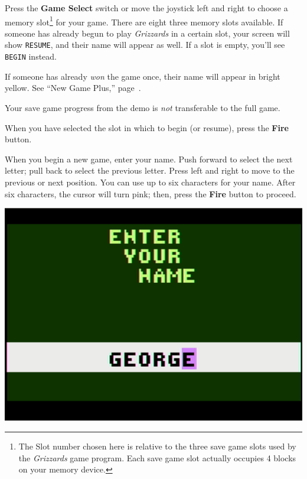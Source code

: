 \documentclass[10pt,twocolumn,openany,article]{memoir}
\begin{document}
Press  the \textbf{Game  Select} switch  or move  the joystick  left and
right to  choose a  memory slot\ifdefined\ATARIAGESAVE\else\footnote{The
  Slot number chosen here is relative  to the three save game slots used
  by the \textit{Grizzards}  game program. Each save  game slot actually
  occupies  4  blocks  on  your  memory  device.}\fi{}  for  your  game.
There  are \ifdefined\ATARIAGESAVE  eight \else  three \fi  memory slots
available. If  someone has  already begun  to play  \textit{Grizzards} in
a certain  slot, your  screen will  show \texttt{RESUME},  and their
name  will   appear  as   well.  If   a  slot   is  empty,   you'll  see
\texttt{BEGIN} instead.

If someone has already \emph{won} the  game once, their name will appear
in bright yellow. See ``New Game Plus,'' page~\pageref{sec:NewGamePlus}.

\ifdefined\DEMO

\skip

Your save game progress from the demo is \emph{not} transferable to the
full game.

\skip

\fi

When you have selected the slot in which to begin (or resume), press the
\textbf{Fire} button.

\fi

\ifdefined\NOSAVE\else

When you begin a  new game, enter your name. Push  forward to select the
next letter;  pull back to  select the  previous letter. Press  left and
right to move to  the previous or next position. You can  use up to six
characters for  your name.  After six characters,  the cursor  will turn
pink; then, press the \textbf{Fire} button to proceed.

\begin{center}
  \includegraphics[width=\columnwidth]{../Manual/NameEntryNTSC.png}
\end{center}
\end{document}
